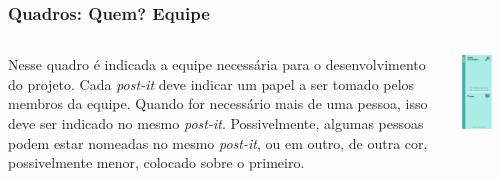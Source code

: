 \documentclass[aspectratio=169]{beamer}
\begin{document}
\begin{frame}
\frametitle{Quadros: Quem? Equipe}
\begin{columns}
    \begin{column}{.66\textwidth}
Nesse quadro é indicada a equipe necessária para o desenvolvimento do projeto. Cada \textit{post-it} deve indicar um papel a ser tomado pelos membros da equipe. Quando for necessário mais de uma pessoa, isso deve ser indicado no mesmo \textit{post-it}. Possivelmente, algumas pessoas podem estar nomeadas no mesmo \textit{post-it}, ou em outro, de outra cor, possivelmente menor, colocado sobre o primeiro.
    \end{column}
    \begin{column}{.33\textwidth}
            \centering
    \includegraphics[width=0.6\textwidth]{detalhes/quem.png}
    \end{column}
\end{columns}
\end{frame}
\end{document}

